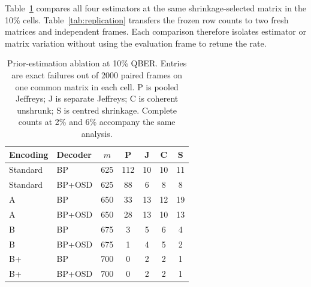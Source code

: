 Table~\ref{tab:ablation} compares all four estimators at the same shrinkage-selected
matrix in the 10\% cells. Table~\ref{tab:replication} transfers the frozen row counts to
two fresh matrices and independent frames. Each comparison therefore isolates estimator
or matrix variation without using the evaluation frame to retune the rate.
\begin{table}[htbp]
\centering
\small\setlength{\tabcolsep}{3.2pt}
\caption{Prior-estimation ablation at 10\% QBER. Entries are exact failures out of 2000 paired frames on one common matrix in each cell. P is pooled Jeffreys; J is separate Jeffreys; C is coherent unshrunk; S is centred shrinkage. Complete counts at 2\% and 6\% accompany the same analysis.}
\label{tab:ablation}
\begin{tabular}{@{}llccccc@{}}
\toprule
Encoding & Decoder & $m$ & P & J & C & S \\
\midrule
Standard & BP & 625 & 112 & 10 & 10 & 11 \\
Standard & BP+OSD & 625 & 88 & 6 & 8 & 8 \\
A & BP & 650 & 33 & 13 & 12 & 19 \\
A & BP+OSD & 650 & 28 & 13 & 10 & 13 \\
B & BP & 675 & 3 & 5 & 6 & 4 \\
B & BP+OSD & 675 & 1 & 4 & 5 & 2 \\
B+ & BP & 700 & 0 & 2 & 2 & 1 \\
B+ & BP+OSD & 700 & 0 & 2 & 2 & 1 \\
\bottomrule
\end{tabular}
\end{table}

